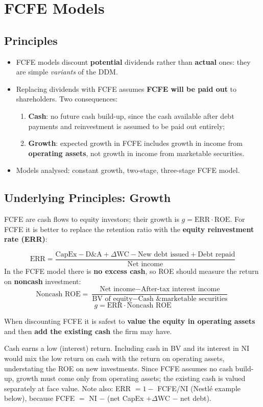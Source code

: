 \section{FCFE Models}

\subsection{Principles}
\begin{itemize}
  \item FCFE models discount \textbf{potential} dividends rather than \textbf{actual} ones: they are simple \emph{variants} of the DDM.
  \item Replacing dividends with FCFE assumes \textbf{FCFE will be paid out} to shareholders. Two consequences:
  \begin{enumerate}
    \item \textbf{Cash}: no future cash build-up, since the cash available after debt payments and reinvestment is assumed to be paid out entirely;
    \item \textbf{Growth}: expected growth in FCFE includes growth in income from \textbf{operating assets}, not growth in income from marketable securities.
  \end{enumerate}
  \item Models analysed: constant growth, two-stage, three-stage FCFE model.
\end{itemize}

\subsection{Underlying Principles: Growth}
FCFE are cash flows to equity investors; their growth is $g=\text{ERR}\cdot\text{ROE}$. For FCFE it is better to replace the retention ratio with the \textbf{equity reinvestment rate (ERR)}:
\begin{keybox}
\[
\text{ERR}=\frac{\text{CapEx}-\text{D\&A}+\Delta\text{WC}-\text{New debt issued}+\text{Debt repaid}}{\text{Net income}}
\]
In the FCFE model there is \textbf{no excess cash}, so ROE should measure the return on \textbf{noncash} investment:
\[
\text{Noncash ROE}=\frac{\text{Net income}-\text{After-tax interest income}}{\text{BV of equity}-\text{Cash \& marketable securities}}
\]
\[
\boxed{g=\text{ERR}\cdot\text{Noncash ROE}}
\]
\end{keybox}
When discounting FCFE it is safest to \textbf{value the equity in operating assets} and then \textbf{add the existing cash} the firm may have.
\begin{addbox}
Cash earns a low (interest) return. Including cash in BV and its interest in NI would mix the low return on cash with the return on operating assets, understating the ROE on new investments. Since FCFE assumes no cash build-up, growth must come only from operating assets; the existing cash is valued separately at face value. Note also: ERR $=1-$ FCFE/NI (Nestl\'e example below), because FCFE $=$ NI $-$ (net CapEx $+\Delta$WC $-$ net debt).
\end{addbox}

